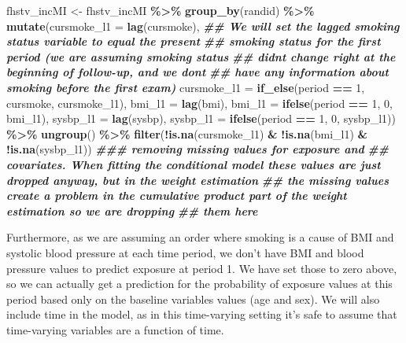 \documentclass[
]{book}
\newenvironment{Shaded}{\begin{snugshade}}{\end{snugshade}}
\newcommand{\AttributeTok}[1]{\textcolor[rgb]{0.13,0.29,0.53}{#1}}
\newcommand{\DecValTok}[1]{\textcolor[rgb]{0.00,0.00,0.81}{#1}}
\newcommand{\DocumentationTok}[1]{\textcolor[rgb]{0.56,0.35,0.01}{\textbf{\textit{#1}}}}
\newcommand{\FunctionTok}[1]{\textcolor[rgb]{0.13,0.29,0.53}{\textbf{#1}}}
\newcommand{\NormalTok}[1]{#1}
\newcommand{\OtherTok}[1]{\textcolor[rgb]{0.56,0.35,0.01}{#1}}
\newcommand{\SpecialCharTok}[1]{\textcolor[rgb]{0.81,0.36,0.00}{\textbf{#1}}}
\begin{document}
\begin{Shaded}
\begin{Highlighting}[]
\NormalTok{fhstv\_incMI }\OtherTok{\textless{}{-}}\NormalTok{ fhstv\_incMI }\SpecialCharTok{\%\textgreater{}\%}
  \FunctionTok{group\_by}\NormalTok{(randid) }\SpecialCharTok{\%\textgreater{}\%}
  \FunctionTok{mutate}\NormalTok{(}\AttributeTok{cursmoke\_l1 =} \FunctionTok{lag}\NormalTok{(cursmoke),}
         \DocumentationTok{\#\# We will set the lagged smoking status variable to equal the present}
         \DocumentationTok{\#\# smoking status for the first period (we are assuming smoking status}
         \DocumentationTok{\#\# didn\textquotesingle{}t change right at the beginning of follow{-}up, and we don\textquotesingle{}t }
         \DocumentationTok{\#\# have any information about smoking before the first exam)}
         \AttributeTok{cursmoke\_l1 =} \FunctionTok{if\_else}\NormalTok{(period }\SpecialCharTok{==} \DecValTok{1}\NormalTok{, cursmoke, cursmoke\_l1), }
         \AttributeTok{bmi\_l1 =} \FunctionTok{lag}\NormalTok{(bmi),}
         \AttributeTok{bmi\_l1 =} \FunctionTok{ifelse}\NormalTok{(period }\SpecialCharTok{==} \DecValTok{1}\NormalTok{, }\DecValTok{0}\NormalTok{, bmi\_l1),}
         \AttributeTok{sysbp\_l1 =} \FunctionTok{lag}\NormalTok{(sysbp),}
         \AttributeTok{sysbp\_l1 =} \FunctionTok{ifelse}\NormalTok{(period }\SpecialCharTok{==} \DecValTok{1}\NormalTok{, }\DecValTok{0}\NormalTok{, sysbp\_l1)) }\SpecialCharTok{\%\textgreater{}\%}
  \FunctionTok{ungroup}\NormalTok{() }\SpecialCharTok{\%\textgreater{}\%} 
  \FunctionTok{filter}\NormalTok{(}\SpecialCharTok{!}\FunctionTok{is.na}\NormalTok{(cursmoke\_l1) }\SpecialCharTok{\&} \SpecialCharTok{!}\FunctionTok{is.na}\NormalTok{(bmi\_l1) }\SpecialCharTok{\&} \SpecialCharTok{!}\FunctionTok{is.na}\NormalTok{(sysbp\_l1)) }\DocumentationTok{\#\#\# removing missing values for exposure and }
\DocumentationTok{\#\# covariates. When fitting the conditional model these values are just dropped anyway, but in the weight estimation}
\DocumentationTok{\#\# the missing values create a problem in the cumulative product part of the weight estimation so we are dropping }
\DocumentationTok{\#\# them here}
\end{Highlighting}
\end{Shaded}

Furthermore, as we are assuming an order where smoking is a cause of BMI and systolic blood pressure at each time period, we don't have BMI and blood pressure values to predict exposure at period 1. We have set those to zero above, so we can actually get a prediction for the probability of exposure values at this period based only on the baseline variables values (age and sex). We will also include time in the model, as in this time-varying setting it's safe to assume that time-varying variables are a function of time.
\end{document}
